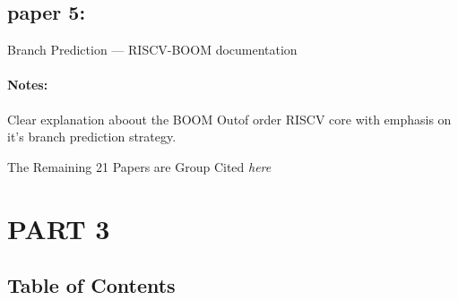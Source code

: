 \documentclass{article}
\begin{document}
\subsection{paper 5:}
Branch Prediction — RISCV-BOOM documentation
\paragraph{Notes: }Clear explanation aboout the BOOM Outof order RISCV core with emphasis on it’s branch prediction strategy.

The Remaining 21 Papers are Group Cited \emph{here}\cite{augustusk.uhtDisjointEagerExecution2002,balasubramanianNoPenaltyControlHazard2024,BranchPredictionUnit,calderFastAccurateInstruction1994,emmaCharacterizationBranchData1987,eversUsingHybridBranch1996,evtyushkinBranchScopeNewSideChannel2018,hartsteinOptimumPipelineDepth2002,heSurveyComparisonPipeline2023,johnsonBranchPredicationUsing1992,kocherSpectreAttacksExploiting2020,koruyehSpectreReturnsSpeculation2018,kostromitinAnalysisMostCommon2020,liConditionalSpeculationEffective2019,linBranchPredictionNot2019,maisuradzeSpeculoseAnalyzingSecurity2018,mohammadiDemandDynamicBranch2015,StaticMethodsHybrid,vitekValidatingSideChannel,wallSpeculativeExecutionInstructionLevel,zhangHybridBranchPrediction2002}

\section{PART 3}
\subsection{Table of Contents}
\end{document}
